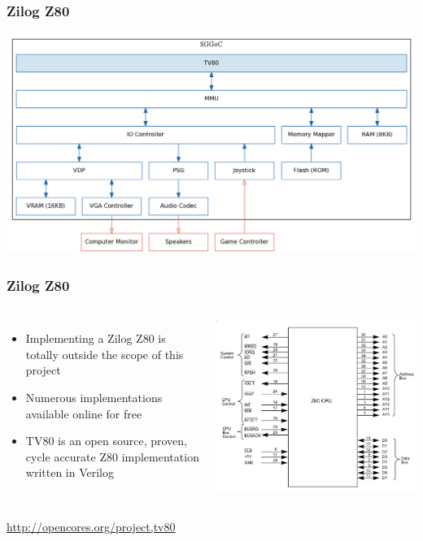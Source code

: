 \documentclass{beamer}
\newlength{\wideitemsep}
\let\olditem\item
\renewcommand{\item}{\setlength{\itemsep}{\wideitemsep}\olditem}
\begin{document}
\begin{frame}
    \frametitle{Zilog Z80}
    \begin{center}
        \includegraphics[width=\textwidth]{../block_diagrams/block_diagram_internal_tv80.png}
    \end{center}
\end{frame}

\begin{frame}
    \frametitle{Zilog Z80}

    \begin{columns}[c]
        \begin{itemize}
            \item<1-> Implementing a Zilog Z80 is totally outside the scope of this project
            \item<2-> Numerous implementations available online for free
            \item<3-> TV80 is an open source, proven, cycle accurate Z80 implementation written in Verilog
        \end{itemize}

            \includegraphics[width=\textwidth]{../design/z80.png}
    \end{columns}
    \vspace{0.5cm}
     { \url{http://opencores.org/project,tv80}}

\end{frame}
\end{document}
